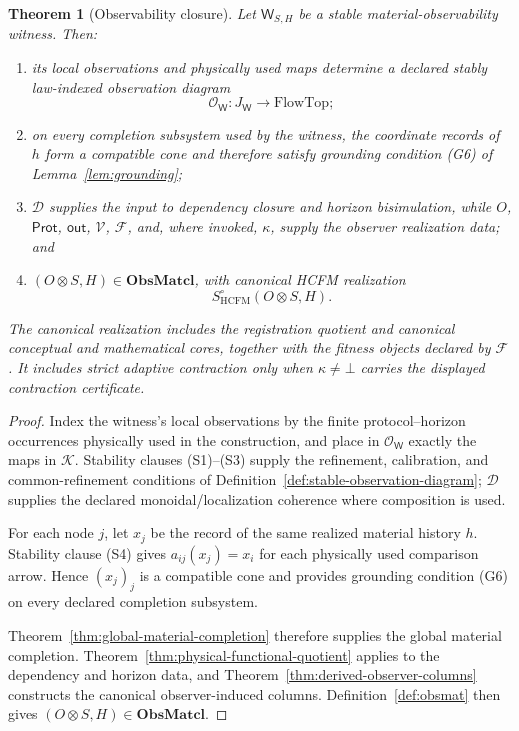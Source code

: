 \documentclass[11pt]{article}
\newtheorem{theorem}{Theorem}
\theoremstyle{definition}
\newcommand{\ObsMatcl}{\mathbf{ObsMatcl}}
\begin{document}
\begin{theorem}[Observability closure]
\label{thm:observability-closure}
Let \(\mathsf{W}_{S,H}\) be a stable material-observability witness. Then:
\begin{enumerate}[label=(\roman*)]
\item its local observations and physically used maps determine a declared
stably law-indexed observation diagram
\[
\mathcal{O}_{\mathsf W}:J_{\mathsf W}\longrightarrow \mathrm{FlowTop};
\]
\item on every completion subsystem used by the witness, the coordinate
records of \(h\) form a compatible cone and therefore satisfy grounding
condition \textup{(G6)} of Lemma~\ref{lem:grounding};
\item \(\mathcal{D}\) supplies the input to dependency closure and horizon
bisimulation, while \(O\), \(\mathsf{Prot}\), \(\mathsf{out}\),
\(\mathcal{V}\), \(\mathcal{F}\), and, where invoked, \(\kappa\), supply the
observer realization data; and
\item \((O\otimes S,H)\in\ObsMatcl\), with canonical HCFM realization
\[
S^{\circ}_{\mathrm{HCFM}}(O\otimes S,H).
\]
\end{enumerate}
The canonical realization includes the registration quotient and canonical
conceptual and mathematical cores, together with the fitness objects declared
by \(\mathcal{F}\). It includes strict adaptive contraction only when
\(\kappa\neq\bot\) carries the displayed contraction certificate.
\end{theorem}

\begin{proof}
Index the witness's local observations by the finite protocol--horizon
occurrences physically used in the construction, and place in
\(\mathcal{O}_{\mathsf W}\) exactly the maps in \(\mathcal{K}\). Stability clauses
\textup{(S1)}--\textup{(S3)} supply the refinement, calibration, and
common-refinement conditions of
Definition~\ref{def:stable-observation-diagram}; \(\mathcal{D}\) supplies
the declared monoidal/localization coherence where composition is used.

For each node \(j\), let \(x_j\) be the record of the same realized material
history \(h\). Stability clause \textup{(S4)} gives
\(a_{ij}(x_j)=x_i\) for each physically used comparison arrow. Hence
\((x_j)_j\) is a compatible cone and provides grounding condition
\textup{(G6)} on every declared completion subsystem.

Theorem~\ref{thm:global-material-completion} therefore supplies the global
material completion. Theorem~\ref{thm:physical-functional-quotient} applies
to the dependency and horizon data, and
Theorem~\ref{thm:derived-observer-columns} constructs the canonical
observer-induced columns. Definition~\ref{def:obsmat} then gives
\((O\otimes S,H)\in\ObsMatcl\).
\end{proof}
\end{document}
